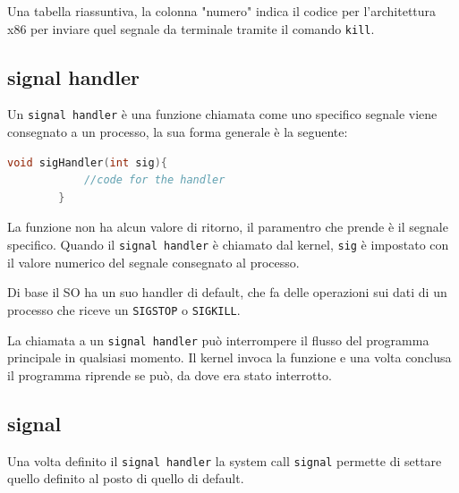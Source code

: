 \documentclass[a4paper, 12pt]{book}
\begin{document}
    Una tabella riassuntiva, la colonna "numero" indica 
    il codice per l'architettura x86 per inviare quel segnale 
    da terminale tramite il comando \verb|kill|.

    \subsection{signal handler}

    Un \verb|signal handler| è una funzione chiamata come 
    uno specifico segnale viene consegnato a un processo,
    la sua forma generale è la seguente:
    \begin{lstlisting}[language=C]
        void sigHandler(int sig){
            //code for the handler
        }
    \end{lstlisting}
    La funzione non ha alcun valore di ritorno, il paramentro 
    che prende è il segnale specifico. Quando il \verb|signal handler|
    è chiamato dal kernel, \verb|sig| è impostato con il 
    valore numerico del segnale consegnato al processo.

    Di base il SO ha un suo handler di default, che fa delle 
    operazioni sui dati di un processo che riceve un 
    \verb|SIGSTOP| o \verb|SIGKILL|.

    La chiamata a un \verb|signal handler| può interrompere 
    il flusso del programma principale in qualsiasi momento. 
    Il kernel invoca la funzione e una volta conclusa il
    programma riprende se può, da dove era stato interrotto.

    \subsection{signal}

    Una volta definito il \verb|signal handler| la system call
    \verb|signal| permette di settare quello definito 
    al posto di quello di default.
\end{document}
